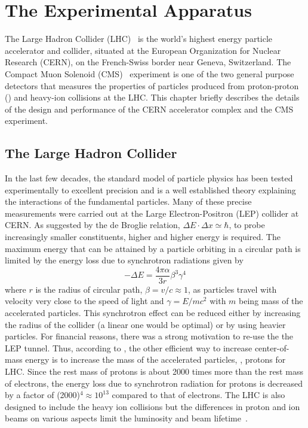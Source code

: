 \chapter{The Experimental Apparatus}\label{ch:ExptApp}

The Large Hadron Collider (LHC)~\cite{Brüning:782076,Evans:2008zzb} is the world's highest energy particle accelerator and collider, situated
at the European Organization for Nuclear Research (CERN), on the French-Swiss border near Geneva, Switzerland. The Compact Muon Solenoid 
(CMS)~\cite{Chatrchyan:2008aa} experiment is one of the two general purpose detectors that measures the properties of particles produced 
from proton-proton (\pp) and heavy-ion collisions at the LHC. This chapter briefly describes the details of the design and performance 
of the CERN accelerator complex and the CMS experiment.

\section{The Large Hadron Collider}
In the last few decades, the standard model of particle physics has been tested experimentally to excellent precision and is a well established theory
explaining the interactions of the fundamental particles. Many of these precise measurements were carried out at the Large Electron-Positron
 (\gls{LEP}) collider at CERN. As suggested by the de Broglie relation, $\Delta\text{}E\cdot\Delta{x}\simeq{\hbar}$, to probe increasingly smaller 
constituents, higher and higher energy is required. The maximum energy that can be attained by a particle orbiting in a circular path is limited by the 
energy loss due to synchrotron radiations given by
\begin{equation}
-\Delta{E} = \frac{4\pi\alpha}{3r}\beta^{3}\gamma^{4}
\label{eq:synRadn}
\end{equation}
where $r$ is the radius of circular path, $\beta=v/c\approx1$, as particles travel with velocity very close to the speed of light and $\gamma=E/mc^{2}$
with $m$ being mass of the accelerated particles. This synchrotron effect can be reduced either by increasing the radius of the collider (a linear
one would be optimal) or by using heavier particles. For financial reasons, there was a strong motivation to re-use the the LEP tunnel. Thus, 
according to \eqn{\ref{eq:synRadn}}, the other efficient way to increase center-of-mass energy is to increase the mass of the accelerated particles, 
\ie, protons for LHC. Since the rest mass of protons is about 2000 times more than the rest mass of electrons, the energy loss due to synchrotron 
radiation for protons is decreased by a factor of (2000)$^{4}\approx10^{13}$ compared to that of electrons.
The LHC is also designed to include the heavy ion collisions but the differences in proton and ion beams on various aspects limit the luminosity and 
beam lifetime~\cite{Evans:2008zzb}.

